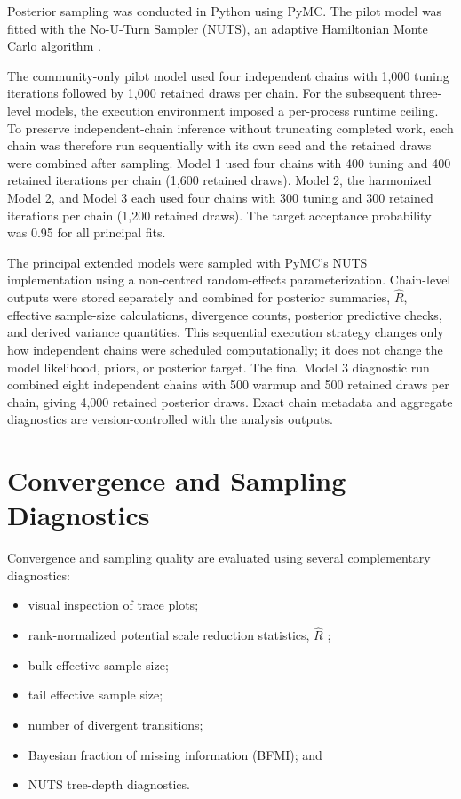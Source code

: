 Posterior sampling was conducted in Python using PyMC. The pilot model was fitted with the No-U-Turn Sampler (NUTS), an adaptive Hamiltonian Monte Carlo algorithm \citep{HoffmanGelman2014}.

The community-only pilot model used four independent chains with 1,000 tuning iterations followed by 1,000 retained draws per chain. For the subsequent three-level models, the execution environment imposed a per-process runtime ceiling. To preserve independent-chain inference without truncating completed work, each chain was therefore run sequentially with its own seed and the retained draws were combined after sampling. Model 1 used four chains with 400 tuning and 400 retained iterations per chain (1,600 retained draws). Model 2, the harmonized Model 2, and Model 3 each used four chains with 300 tuning and 300 retained iterations per chain (1,200 retained draws). The target acceptance probability was 0.95 for all principal fits.

The principal extended models were sampled with PyMC's NUTS implementation using a non-centred random-effects parameterization. Chain-level outputs were stored separately and combined for posterior summaries, $\hat{R}$, effective sample-size calculations, divergence counts, posterior predictive checks, and derived variance quantities. This sequential execution strategy changes only how independent chains were scheduled computationally; it does not change the model likelihood, priors, or posterior target. The final Model 3 diagnostic run combined eight independent chains with 500 warmup and 500 retained draws per chain, giving 4,000 retained posterior draws. Exact chain metadata and aggregate diagnostics are version-controlled with the analysis outputs.

\section{Convergence and Sampling Diagnostics}

Convergence and sampling quality are evaluated using several complementary diagnostics:

\begin{itemize}
    \item visual inspection of trace plots;
    \item rank-normalized potential scale reduction statistics, $\hat{R}$ \citep{VehtariEtAl2021};
    \item bulk effective sample size;
    \item tail effective sample size;
    \item number of divergent transitions;
    \item Bayesian fraction of missing information (BFMI); and
    \item NUTS tree-depth diagnostics.
\end{itemize}

